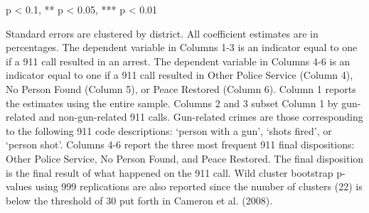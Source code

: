 \begin{table}[H]
\begin{threeparttable}
\begin{tablenotes}
\item * p < 0.1, ** p < 0.05, *** p < 0.01
\item Standard errors are clustered by district. All                      coefficient estimates are in percentages.                      The dependent variable in Columns 1-3 is an indicator equal to one if a 911 call resulted in an arrest.                      The dependent variable in Columns 4-6 is an indicator equal to one if a 911 call resulted in                       Other Police Service (Column 4), No Person Found (Column 5), or Peace Restored (Column 6).                      Column 1 reports the estimates using the entire sample.                  Columns 2 and 3 subset Column 1 by gun-related and non-gun-related 911 calls.                  Gun-related crimes are those corresponding to the following                  911 code descriptions: `person with a gun',                  `shots fired', or `person shot'.                   Columns 4-6 report the three most frequent 911 final dispositions: Other Police Service, No Person Found,                   and Peace Restored. The final disposition is the final result of                  what happened on the 911 call.                   Wild cluster bootstrap p-values using 999 replications are also reported                  since the number of clusters (22) is below the threshold of 30 put forth in                  Cameron et al. (2008).                  
\end{tablenotes}
\end{threeparttable}
\end{table}
